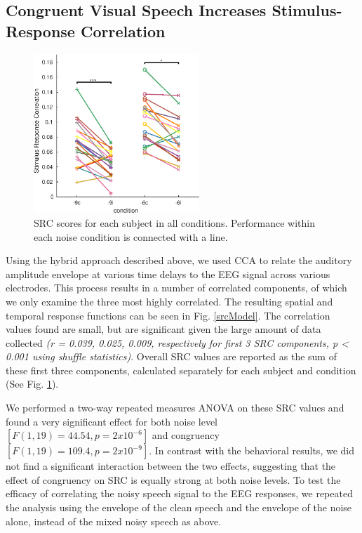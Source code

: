 \documentclass[10pt,letterpaper]{article}
\begin{document}
\subsection{Congruent Visual Speech Increases Stimulus-Response Correlation}

  \begin{figure}[]
    \begin{center}
      \includegraphics[width=0.7\columnwidth,height=6cm]{Figure4}
    \end{center}
    \caption{SRC scores for each subject in all conditions.
    Performance within each noise condition is connected 
    with a line.}
    \label{srcResults}
  \end{figure}

  Using the hybrid approach described above, we used CCA 
  to relate the auditory amplitude envelope at various time delays to the 
  EEG signal across various electrodes. This process results in a number of 
  correlated components, of which we only examine the three most highly 
  correlated. The resulting spatial and temporal 
  response functions can be seen in Fig. \ref{srcModel}. The correlation 
  values found are small, but are significant given the large amount of 
  data collected \textit{(r = 0.039, 0.025, 0.009, respectively for 
  first 3 SRC components, p < 0.001 using shuffle statistics)}.
  Overall SRC values are reported as the sum of these first three components, 
  calculated separately for each subject and condition 
  (See Fig. \ref{srcResults}).

  We performed a two-way repeated measures ANOVA on these SRC values and found 
  a very significant effect for both noise level 
  $[F(1, 19) = 44.54, p = 2 x 10^{-6}]$ and congruency 
  $[F(1, 19) = 109.4, p = 2 x 10^{-9}]$. In contrast with the behavioral 
  results, we did not find a significant interaction between the two effects,
  suggesting that the effect of congruency on SRC is equally strong at both 
  noise levels. 
  To test the efficacy of correlating the noisy speech signal to the EEG
  responses, we repeated the analysis using the envelope of the 
  clean speech and the envelope of the noise alone, 
  instead of the mixed noisy speech as above.
\end{document}
